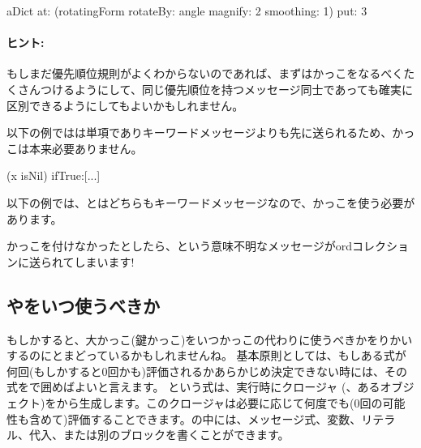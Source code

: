 \documentclass[a4paper,10pt,twoside]{book}
\begin{document}
\begin{code}{}
aDict
   at: (rotatingForm 
          rotateBy: angle	
          magnify: 2 
          smoothing: 1)
   put: 3
\end{code}



\paragraph{ヒント:} もしまだ優先順位規則がよくわからないのであれば、まずはかっこをなるべくたくさんつけるようにして、同じ優先順位を持つメッセージ同士であっても確実に区別できるようにしてもよいかもしれません。

以下の例ではは単項でありキーワードメッセージよりも先に送られるため、かっこは本来必要ありません。
\begin{code}{}
(x isNil)
   ifTrue:[...]
\end{code}

以下の例では、とはどちらもキーワードメッセージなので、かっこを使う必要があります。
\noindent
かっこを付けなかったとしたら、という意味不明なメッセージがordコレクションに送られてしまいます!

\subsection{\lct{[ ]}や\lct{( )}をいつ使うべきか}
もしかすると、大かっこ(鍵かっこ)をいつかっこの代わりに使うべきかをりかいするのにとまどっているかもしれませんね。
基本原則としては、もしある式が何回(もしかすると0回かも)評価されるかあらかじめ決定できない時には、その式を\ct{[ ]}で囲めばよいと言えます。
という式は、実行時にクロージャ (\ie、あるオブジェクト)をから生成します。このクロージャは必要に応じて何度でも(0回の可能性も含めて)評価することできます。\ct{[ ]}の中には、メッセージ式、変数、リテラル、代入、または別のブロックを書くことができます。
\end{document}

